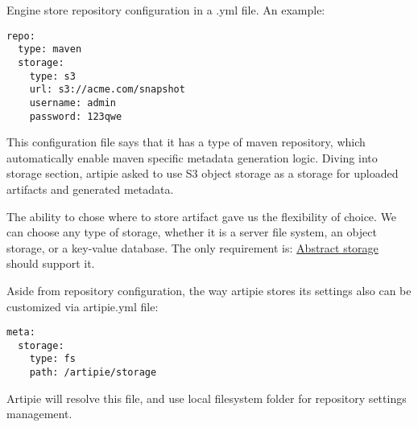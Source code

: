 \documentclass[12pt,oneside]{article}
\begin{document}
\begin{center}
\end{center}

Engine store repository configuration in a .yml file. An example:
\begin{Verbatim}[tabsize=2]
repo:
  type: maven
  storage:
    type: s3
    url: s3://acme.com/snapshot
    username: admin
    password: 123qwe
\end{Verbatim}

This configuration file says that it has a type of maven repository,
which automatically enable maven specific metadata generation logic.
Diving into storage section, artipie asked to use S3 object storage 
as a storage for uploaded artifacts and generated metadata.

The ability to chose where to store artifact gave us the flexibility of choice.
We can choose any type of storage, whether it is a server file system,
an object storage, or a key-value database.
The only requirement is: \hyperref[sec:asto]{Abstract storage} should support it.

Aside from repository configuration, the way artipie stores its settings
also can be customized via artipie.yml file:
\begin{Verbatim}[tabsize=2]
meta:
  storage:
    type: fs
    path: /artipie/storage
\end{Verbatim}
Artipie will resolve this file, and use local filesystem folder for repository settings management. 
\end{document}
